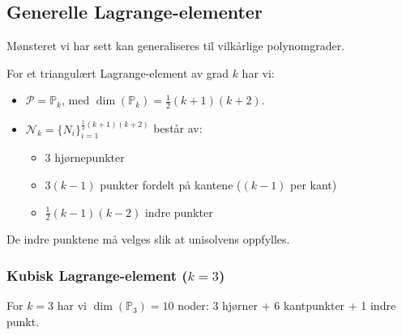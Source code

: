 \documentclass[../../main.tex]{subfiles}
\begin{document}
\subsection{Generelle Lagrange-elementer}

Mønsteret vi har sett kan generaliseres til vilkårlige polynomgrader.


For et triangulært Lagrange-element av grad $k$ har vi:
\begin{itemize}
    \item $\mathcal{P} = \mathbb{P}_k$, med $\dim(\mathbb{P}_k) = \frac{1}{2}(k+1)(k+2)$.
    \item $\mathcal{N}_k = \{N_i\}_{i=1}^{\frac{1}{2}(k+1)(k+2)}$ består av:
    \begin{itemize}
        \item 3 hjørnepunkter
        \item $3(k-1)$ punkter fordelt på kantene ($(k-1)$ per kant)
        \item $\frac{1}{2}(k-1)(k-2)$ indre punkter
    \end{itemize}
\end{itemize}

De indre punktene må velges slik at unisolvens oppfylles.

\subsubsection{Kubisk Lagrange-element ($k=3$)}

For $k=3$ har vi $\dim(\mathbb{P}_3) = 10$ noder: 3 hjørner + 6 kantpunkter + 1 indre punkt.

\begin{center}
    
\end{center}
\end{document}
